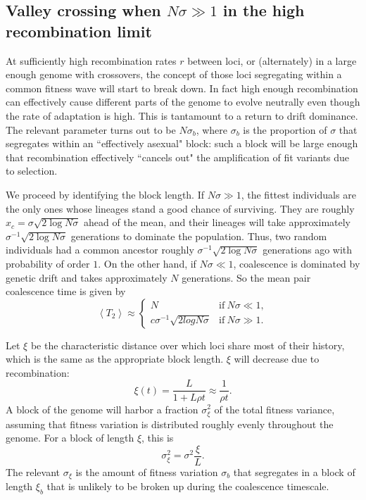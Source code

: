 \documentclass[10pt]{revtex4}
\begin{document}
\subsection{Valley crossing when $N\sigma \gg 1$ in the high recombination limit}

At sufficiently high recombination rates $r$ between loci, or (alternately) in a large enough genome with crossovers, the concept of those loci segregating within a common fitness wave will start to break down.
In fact high enough recombination can effectively cause different parts of the genome to evolve neutrally even though the rate of adaptation is high.
This is tantamount to a return to drift dominance.
The relevant parameter turns out to be $N\sigma_b$, where $\sigma_b$ is the proportion of $\sigma$ that segregates within an ``effectively asexual" block: such a block will be large enough that recombination effectively ``cancels out" the amplification of fit variants due to selection.

We proceed by identifying the block length.
If $N\sigma \gg 1$, the fittest individuals are the only ones whose lineages stand a good chance of surviving.
They are roughly $x_c = \sigma \sqrt{2 \log N\sigma}$ ahead of the mean, and their lineages will take approximately $\sigma^{-1} \sqrt{2 \log N\sigma}$ generations to dominate the population.
Thus, two random individuals had a common ancestor roughly $\sigma^{-1} \sqrt{2 \log N\sigma}$ generations ago with probability of order $1$.
On the other hand, if $N\sigma \ll 1$, coalescence is dominated by genetic drift and takes approximately $N$ generations. So the mean pair coalescence time is given by
\begin{equation}
\left< T_2 \right> \approx
\begin{cases}
N & \mathrm{if~} N\sigma \ll 1, \\
c\sigma^{-1}\sqrt{2 log N\sigma} & \mathrm{if~} N\sigma \gg 1.
\end{cases}
\end{equation}

Let $\xi$ be the characteristic distance over which loci share most of their history, which is the same as the appropriate block length.
$\xi$ will decrease due to recombination:
\begin{equation}
\xi (t) = \frac{L}{1 + L\rho t} \approx \frac{1}{\rho t}.
\end{equation}
A block of the genome will harbor a fraction $\sigma_\xi^2$ of the total fitness variance, assuming that fitness variation is distributed roughly evenly throughout the genome.
For a block of length $\xi$, this is
\begin{equation}
\sigma^2_\xi = \sigma^2 \frac{\xi}{L}.
\end{equation}
The relevant $\sigma_\xi$ is the amount of fitness variation $\sigma_b$ that segregates in a block of length $\xi_b$ that is unlikely to be broken up during the coalescence timescale.
\end{document}
